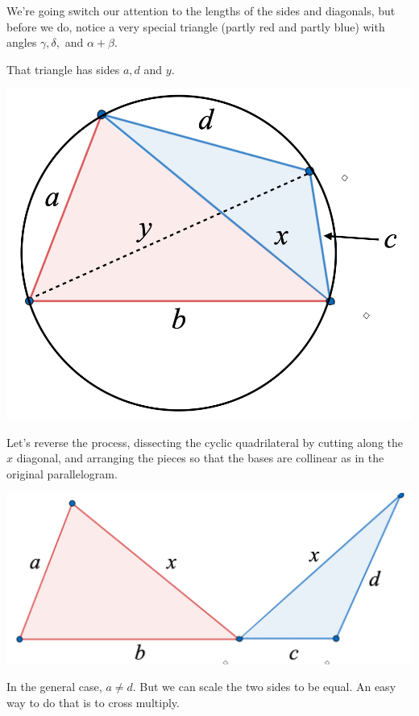 \documentclass[11pt, oneside]{article}
\begin{document}
We're going switch our attention to the lengths of the sides and diagonals, but before we do, notice a very special triangle (partly red and partly blue) with angles $\gamma, \delta,$ and $\alpha + \beta$.  

That triangle has sides $a, d$ and $y$.
\begin{center} \includegraphics [scale=0.2] {Ptol7.png} \end{center}

Let's reverse the process, dissecting the cyclic quadrilateral by cutting along the $x$ diagonal, and arranging the pieces so that the bases are collinear as in the original parallelogram.

\begin{center} \includegraphics [scale=0.2] {Ptol8.png} \end{center}

In the general case, $a \ne d$.  But we can scale the two sides to be equal.  An easy way to do that is to cross multiply.
\end{document}
